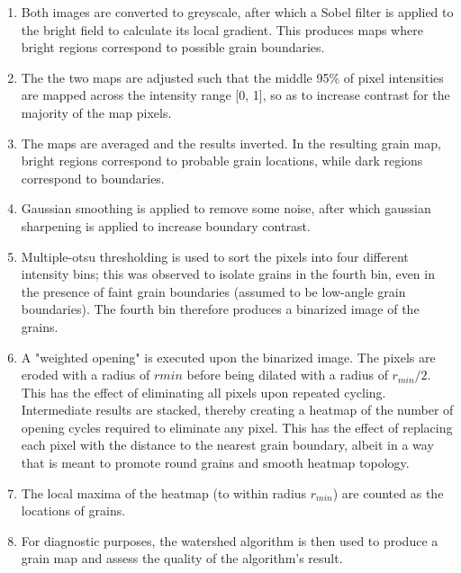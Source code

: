 \begin{enumerate}

	\item Both images are converted to greyscale, after which a Sobel filter is applied to the bright field to calculate its local gradient.  This produces maps where bright regions correspond to possible grain boundaries.

	\item The the two maps are adjusted such that the middle 95\% of pixel intensities are mapped across the intensity range [0, 1], so as to increase contrast for the majority of the map pixels.

	\item The maps are averaged and the results inverted.  In the resulting grain map, bright regions correspond to probable grain locations, while dark regions correspond to boundaries.

	\item Gaussian smoothing is applied to remove some noise, after which gaussian sharpening is applied to increase boundary contrast.

	\item Multiple-otsu thresholding is used to sort the pixels into four different intensity bins; this was observed to isolate grains in the fourth bin, even in the presence of faint grain boundaries (assumed to be low-angle grain boundaries).  The fourth bin therefore produces a binarized image of the grains.

	\item A "weighted opening" is executed upon the binarized image.  The pixels are eroded with a radius of $r{min}$ before being dilated with a radius of $r_{min} / 2$.  This has the effect of eliminating all pixels upon repeated cycling.  Intermediate results are stacked, thereby creating a heatmap of the number of opening cycles required to eliminate any pixel.  This has the effect of replacing each pixel with the distance to the nearest grain boundary, albeit in a way that is meant to promote round grains and smooth heatmap topology.

	\item The local maxima of the heatmap (to within radius $r_{min}$) are counted as the locations of grains.

	\item For diagnostic purposes, the watershed algorithm is then used to produce a grain map and assess the quality of the algorithm's result.

\end{enumerate}

